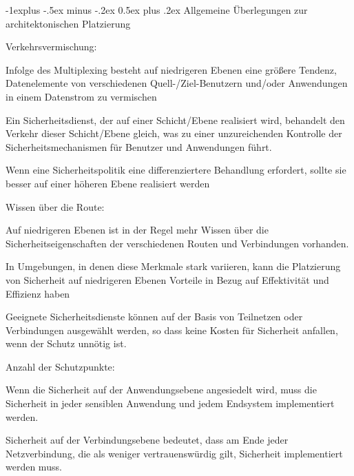 \documentclass[a4paper]{article}
\makeatletter
\renewcommand{\subsection}{\@startsection{subsection}{2}{0mm}%
 {-1explus -.5ex minus -.2ex}%
 {0.5ex plus .2ex}%
 {\normalfont\normalsize\bfseries}}
\makeatother
\begin{document}
\begin{multicols}{3}
      \subsection{Allgemeine Überlegungen zur architektonischen
            Platzierung}

      \begin{itemize*}
            \item Verkehrsvermischung:
            \begin{itemize*}
                  \item Infolge des Multiplexing besteht auf niedrigeren Ebenen eine größere Tendenz, Datenelemente von verschiedenen Quell-/Ziel-Benutzern und/oder Anwendungen in einem Datenstrom zu vermischen
                  \item Ein Sicherheitsdienst, der auf einer Schicht/Ebene realisiert wird, behandelt den Verkehr dieser Schicht/Ebene gleich, was zu einer unzureichenden Kontrolle der Sicherheitsmechanismen für Benutzer und Anwendungen führt.
                  \item Wenn eine Sicherheitspolitik eine differenziertere Behandlung erfordert, sollte sie besser auf einer höheren Ebene realisiert werden
            \end{itemize*}
            \item Wissen über die Route:
            \begin{itemize*}
                  \item Auf niedrigeren Ebenen ist in der Regel mehr Wissen über die Sicherheitseigenschaften der verschiedenen Routen und Verbindungen vorhanden.
                  \item In Umgebungen, in denen diese Merkmale stark variieren, kann die Platzierung von Sicherheit auf niedrigeren Ebenen Vorteile in Bezug auf Effektivität und Effizienz haben
                  \item Geeignete Sicherheitsdienste können auf der Basis von Teilnetzen oder Verbindungen ausgewählt werden, so dass keine Kosten für Sicherheit anfallen, wenn der Schutz unnötig ist.
            \end{itemize*}
            \item Anzahl der Schutzpunkte:
            \begin{itemize*}
                  \item Wenn die Sicherheit auf der Anwendungsebene angesiedelt wird, muss die Sicherheit in jeder sensiblen Anwendung und jedem Endsystem implementiert werden.
                  \item Sicherheit auf der Verbindungsebene bedeutet, dass am Ende jeder Netzverbindung, die als weniger vertrauenswürdig gilt, Sicherheit implementiert werden muss.

\end{itemize*}
\end{itemize*}
\end{multicols}
\end{document}
